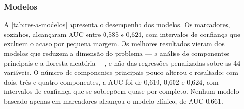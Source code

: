 \subsubsection{Modelos}

A \autoref{tab:res-a-modelos} apresenta o desempenho dos modelos. Os
marcadores, sozinhos, alcançaram \gls{AUC} entre 0,585 e 0,624, com
intervalos de confiança que excluem o acaso por pequena margem. Os melhores
resultados vieram dos modelos que reduzem a dimensão do problema --- a
análise de componentes principais e a floresta aleatória ---, e não das
regressões penalizadas sobre as 44 variáveis. O número de componentes
principais pouco alterou o resultado: com dois, três e quatro componentes,
a \gls{AUC} foi de 0,610, 0,602 e 0,624, com intervalos de confiança que se
sobrepõem quase por completo. Nenhum modelo baseado apenas
em marcadores alcançou o modelo clínico, de \gls{AUC} 0,661.

